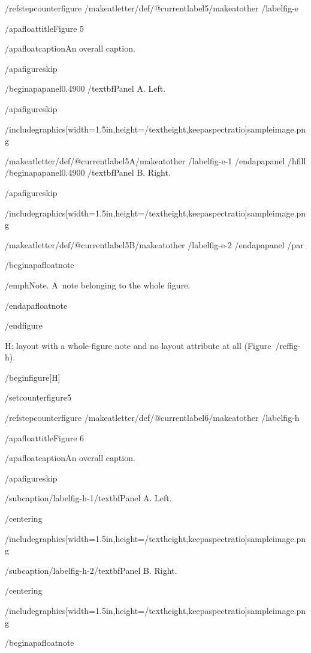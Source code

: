 /refstepcounter{figure}%
/makeatletter/def/@currentlabel{5}/makeatother%
/label{fig-e}

/apafloattitle{Figure 5}

/apafloatcaption{An overall caption.}

/apafigureskip

/begin{apapanel}{0.4900}%
/textbf{Panel A}. Left.

/apafigureskip

/includegraphics[width=1.5in,height=/textheight,keepaspectratio]{sampleimage.png}

/makeatletter/def/@currentlabel{5A}/makeatother%
/label{fig-e-1}
/end{apapanel}%
/hfill
/begin{apapanel}{0.4900}%
/textbf{Panel B}. Right.

/apafigureskip

/includegraphics[width=1.5in,height=/textheight,keepaspectratio]{sampleimage.png}

/makeatletter/def/@currentlabel{5B}/makeatother%
/label{fig-e-2}
/end{apapanel}%
/par

/begin{apafloatnote}

/emph{Note}. A~note belonging to the whole figure.

/end{apafloatnote}

/end{figure}

H: layout with a whole-figure note and no layout attribute at all
(Figure~/ref{fig-h}).

/begin{figure}[H]

/setcounter{figure}{5}

/refstepcounter{figure}%
/makeatletter/def/@currentlabel{6}/makeatother%
/label{fig-h}

/apafloattitle{Figure 6}

/apafloatcaption{An overall caption.}

/apafigureskip

/subcaption{/label{fig-h-1}/textbf{Panel A}. Left.}

/centering{

/includegraphics[width=1.5in,height=/textheight,keepaspectratio]{sampleimage.png}

}

/subcaption{/label{fig-h-2}/textbf{Panel B}. Right.}

/centering{

/includegraphics[width=1.5in,height=/textheight,keepaspectratio]{sampleimage.png}

}

/begin{apafloatnote}

